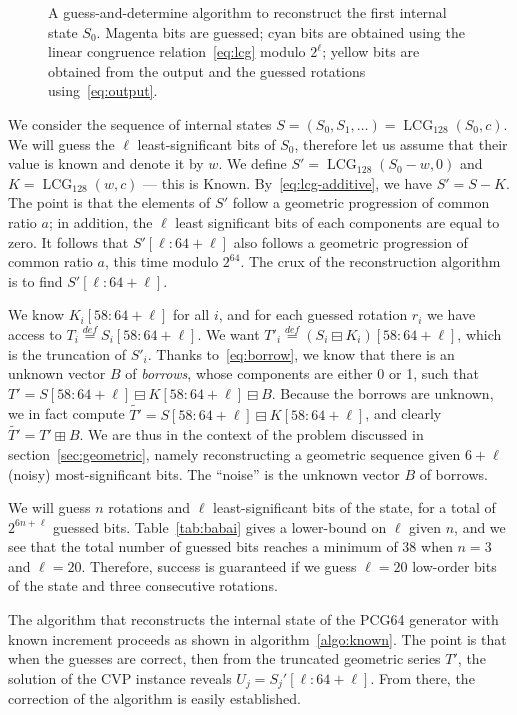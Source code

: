 \documentclass[submission,svgnames,journal=tosc]{iacrtrans}
\DeclareMathOperator{\LCG}{LCG}
\begin{document}
\begin{figure}
\begin{center}
\end{center}
\caption{A guess-and-determine algorithm to reconstruct the first internal state
  $S_0$. Magenta bits are guessed; cyan bits are obtained using the linear
  congruence relation~\eqref{eq:lcg} modulo $2^\ell$; yellow bits are obtained
  from the output and the guessed rotations using~\eqref{eq:output}.}
\label{fig:Cknown}
\end{figure}

We consider the sequence of internal states
$S = (S_0, S_1, \dots) = \LCG_{128}(S_0, c)$. We will guess the $\ell$
least-significant bits of $S_0$, therefore let us assume that their value is
known and denote it by $w$. We define $S' = \LCG_{128}(S_0 - w, 0)$ and
$K = \LCG_{128}(w, c)$ --- this is Known. By~\eqref{eq:lcg-additive}, we have
$S' = S - K$. The point is that the elements of $S'$ follow a geometric
progression of common ratio $a$; in addition, the $\ell$ least significant bits
of each components are equal to zero. It follows that $S'[\ell:64+\ell]$ also
follows a geometric progression of common ratio $a$, this time modulo
$2^{64}$. The crux of the reconstruction algorithm is to find
$S'[\ell:64+\ell]$.

We know $K_i[58:64+\ell]$ for all $i$, and for each guessed rotation $r_i$ we
have access to $T_i \stackrel{def}{=} S_i[58:64+\ell]$.  We want
$T'_i \stackrel{def}{=} (S_i \boxminus K_i)[58:64+\ell]$, which is the
truncation of $S'_i$. Thanks to~\eqref{eq:borrow}, we know that there is an
unknown vector $B$ of \emph{borrows}, whose components are either 0 or 1, such
that $T' = S[58:64+\ell] \boxminus K[58:64+\ell] \boxminus B$. Because the
borrows are unknown, we in fact compute
$\widetilde{T'} = S[58:64+\ell] \boxminus K[58:64+\ell]$, and clearly
$\widetilde{T'} = T' \boxplus B$. We are thus in the context of the problem
discussed in section~\ref{sec:geometric}, namely reconstructing a geometric
sequence given $6+\ell$ (noisy) most-significant bits. The ``noise'' is the
unknown vector $B$ of borrows. %

We will guess $n$ rotations and $\ell$ least-significant bits of the state, for
a total of $2^{6n + \ell}$ guessed bits. Table~\ref{tab:babai} gives a
lower-bound on $\ell$ given $n$, and we see that the total number of guessed
bits reaches a minimum of $38$ when $n=3$ and $\ell=20$. Therefore, success is
guaranteed if we guess $\ell = 20$ low-order bits of the state and three
consecutive rotations.

The algorithm that reconstructs the internal state of the \textsf{PCG64}
generator with known increment proceeds as shown in
algorithm~\ref{algo:known}. The point is that when the guesses are correct, then
from the truncated geometric series $T'$, the solution of the CVP instance
reveals $U_j = S_j'[\ell:64+\ell]$. From there, the correction of the algorithm
is easily established.
\end{document}

